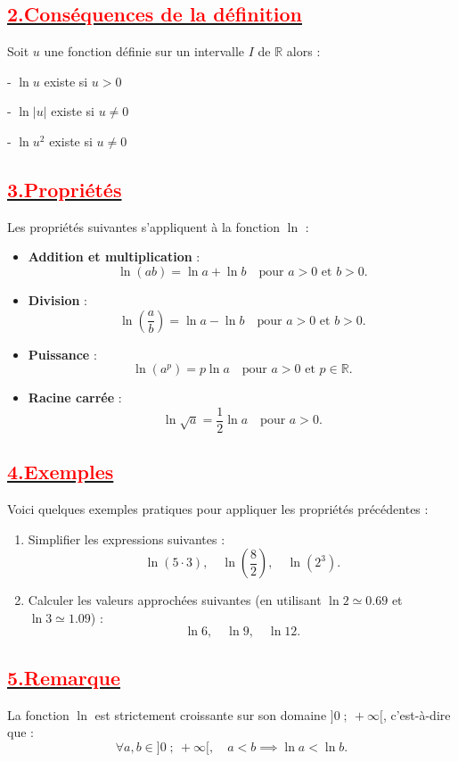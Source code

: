 \documentclass[12pt]{article}
\begin{document}
\subsection*{\underline{\textbf{\textcolor{red}{2.Conséquences de la définition}}}}
Soit $u$ une fonction définie sur un intervalle $I$ de $\mathbb{R}$ alors :

- $\ln u$ existe si $u > 0$

- $\ln |u|$ existe si $u \neq 0$

- $\ln u^{2}$ existe si $u \neq 0$

\subsection*{\underline{\textbf{\textcolor{red}{3.Propriétés}}}}
Les propriétés suivantes s'appliquent à la fonction $\ln$ :
\begin{itemize}
    \item \textbf{Addition et multiplication} :
    \[
    \ln(ab) = \ln a + \ln b \quad \text{pour } a > 0 \text{ et } b > 0.
    \]
    \item \textbf{Division} :
    \[
    \ln\left(\dfrac{a}{b}\right) = \ln a - \ln b \quad \text{pour } a > 0 \text{ et } b > 0.
    \]
    \item \textbf{Puissance} :
    \[
    \ln(a^p) = p \ln a \quad \text{pour } a > 0 \text{ et } p \in \mathbb{R}.
    \]
    \item \textbf{Racine carrée} :
    \[
    \ln\sqrt{a} = \dfrac{1}{2} \ln a \quad \text{pour } a > 0.
    \]
\end{itemize}

\subsection*{\underline{\textbf{\textcolor{red}{4.Exemples}}}}
Voici quelques exemples pratiques pour appliquer les propriétés précédentes :
\begin{enumerate}
    \item Simplifier les expressions suivantes :
    \[
    \ln(5 \cdot 3), \quad \ln\left(\dfrac{8}{2}\right), \quad \ln(2^3).
    \]
    \item Calculer les valeurs approchées suivantes (en utilisant $\ln 2 \simeq 0.69$ et $\ln 3 \simeq 1.09$) :
    \[
    \ln 6, \quad \ln 9, \quad \ln 12.
    \]
\end{enumerate}

\subsection*{\underline{\textbf{\textcolor{red}{5.Remarque}}}}
La fonction $\ln$ est strictement croissante sur son domaine $]0\;;\ +\infty[$, c'est-à-dire que :
\[
\forall a, b \in ]0\;;\ +\infty[, \quad a < b \implies \ln a < \ln b.
\]
\end{document}

